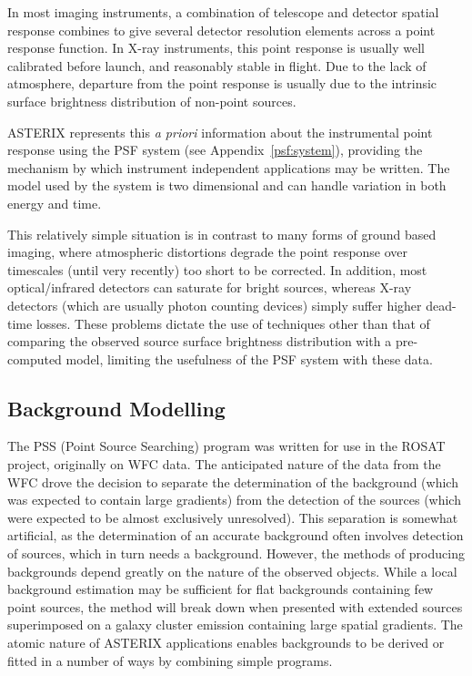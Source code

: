 In most imaging instruments, a combination of telescope and detector spatial 
response combines
to give several detector resolution elements across a point response
function. In X-ray instruments, this point response is usually
well calibrated before launch, and reasonably stable in flight. Due to
the lack of atmosphere, departure from the point response is usually 
due to the intrinsic surface brightness distribution of non-point sources. 

ASTERIX represents this {\em a priori} information about the instrumental 
point response using the PSF system (see Appendix~\ref{psf:system}), providing
the mechanism by which 
instrument independent applications may be written. The model used by
the system is two dimensional and can handle variation in both energy
and time.

This relatively simple situation is in contrast to many forms of ground based
imaging, where atmospheric distortions degrade the point response over
timescales (until very recently) too short to be corrected. In addition,
most optical/infrared detectors can saturate for bright sources, whereas
X-ray detectors (which are usually photon counting devices) simply suffer
higher dead-time losses. These problems dictate the use of techniques
other than that of comparing the observed source surface brightness
distribution with a pre-computed model, limiting the usefulness of the
PSF system with these data.

\subsection{Background Modelling}

The PSS (Point Source Searching) program was written for use in the
ROSAT project, originally on WFC data. The anticipated nature of the
data from the WFC drove the decision to separate the determination of
the background (which was expected to contain large gradients) from
the detection of the sources (which were expected to be almost exclusively
unresolved). This separation is somewhat artificial, as the 
determination of an accurate background often involves detection of
sources, which in turn needs a background. However, the methods of
producing backgrounds depend greatly on the nature of the observed
objects. While a local background estimation may be sufficient for
flat backgrounds containing few point sources, the method will break
down when presented with extended sources superimposed on a galaxy
cluster emission containing large spatial gradients. The atomic nature
of ASTERIX applications enables backgrounds to be derived or fitted 
in a number of ways by combining simple programs.

